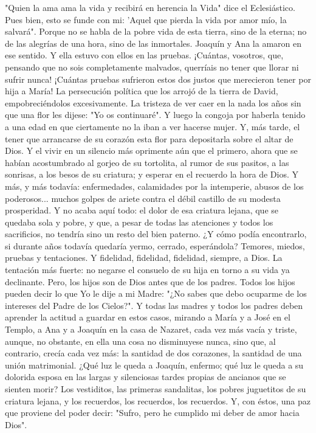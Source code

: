 \documentclass[12pt]{book} %
\begin{document}
"Quien la ama ama la vida y recibirá en herencia la Vida" dice el Eclesiástico. Pues bien, esto se funde con mi: 'Aquel 
que pierda la vida por amor mío, la salvará". Porque no se habla de la pobre vida de esta tierra, sino de la eterna; no de las alegrías de una hora, sino de las inmortales. 
Joaquín y Ana la amaron en ese sentido. Y ella estuvo con ellos en las pruebas. 
¡Cuántas, vosotros, que, pensando que no sois completamente malvados, querríais no tener que llorar ni sufrir nunca! ¡Cuántas pruebas sufrieron estos dos justos que merecieron tener por hija a María! La persecución política que los arrojó de la tierra de David, empobreciéndolos excesivamente. La tristeza de ver caer en la nada los años sin que una flor les dijese: "Yo os continuaré". Y luego la congoja por haberla tenido a una edad en que ciertamente no la iban a ver hacerse mujer. Y, más tarde, el tener que arrancarse de su corazón esta flor para depositarla sobre el altar de Dios. Y el vivir en un silencio más oprimente aún que el primero, ahora que se habían acostumbrado al gorjeo de su tortolita, al rumor de sus pasitos, a las sonrisas, a los besos de su criatura; y esperar en el recuerdo la hora de Dios. Y más, y más todavía: enfermedades, calamidades por la intemperie, abusos de los poderosos... muchos golpes de ariete contra el débil castillo de su modesta prosperidad. Y no acaba aquí todo: el dolor de esa criatura lejana, que se quedaba sola y pobre, y que, a pesar de todas las atenciones y todos los sacrificios, no tendría sino un resto del bien paterno. ¿Y cómo podía encontrarlo, si durante años todavía quedaría yermo, cerrado, esperándola? Temores, miedos, pruebas y tentaciones. Y fidelidad, fidelidad, fidelidad, siempre, a Dios. 
La tentación más fuerte: no negarse el consuelo de su hija en torno a su vida ya declinante. Pero, los hijos son de Dios antes que de los padres. Todos los hijos pueden decir lo que Yo le dije a mi Madre: "¿No sabes que debo ocuparme de los intereses del Padre de los Cielos?". Y todas las madres y todos los padres deben aprender la actitud a guardar en estos casos, mirando a María y a José en el Templo, a Ana y a Joaquín en la casa de Nazaret, cada vez más vacía y triste, aunque, no obstante, en ella una cosa no disminuyese nunca, sino que, al contrario, crecía cada vez más: la santidad de dos corazones, la santidad de una unión matrimonial. 
¿Qué luz le queda a Joaquín, enfermo; qué luz le queda a su dolorida esposa en las largas y silenciosas tardes propias de ancianos que se sienten morir? Los vestiditos, las primeras sandalitas, los pobres juguetitos de su criatura lejana, y los recuerdos, los recuerdos, los recuerdos. Y, con éstos, una paz que proviene del poder decir: "Sufro, pero he cumplido mi deber de amor hacia Dios". 
\end{document}
